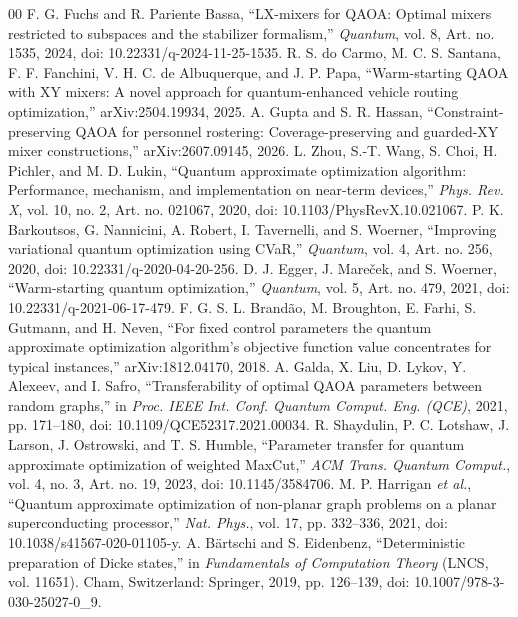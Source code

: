 \documentclass[conference]{IEEEtran}
\begin{document}
\begin{thebibliography}{00}
 F. G. Fuchs and R. Pariente Bassa, ``LX-mixers for QAOA: Optimal mixers restricted to subspaces and the stabilizer formalism,'' \textit{Quantum}, vol. 8, Art. no. 1535, 2024, doi: 10.22331/q-2024-11-25-1535.
 R. S. do Carmo, M. C. S. Santana, F. F. Fanchini, V. H. C. de Albuquerque, and J. P. Papa, ``Warm-starting QAOA with XY mixers: A novel approach for quantum-enhanced vehicle routing optimization,'' arXiv:2504.19934, 2025.
 A. Gupta and S. R. Hassan, ``Constraint-preserving QAOA for personnel rostering: Coverage-preserving and guarded-XY mixer constructions,'' arXiv:2607.09145, 2026.
 L. Zhou, S.-T. Wang, S. Choi, H. Pichler, and M. D. Lukin, ``Quantum approximate optimization algorithm: Performance, mechanism, and implementation on near-term devices,'' \textit{Phys. Rev. X}, vol. 10, no. 2, Art. no. 021067, 2020, doi: 10.1103/PhysRevX.10.021067.
 P. K. Barkoutsos, G. Nannicini, A. Robert, I. Tavernelli, and S. Woerner, ``Improving variational quantum optimization using CVaR,'' \textit{Quantum}, vol. 4, Art. no. 256, 2020, doi: 10.22331/q-2020-04-20-256.
 D. J. Egger, J. Mare\v{c}ek, and S. Woerner, ``Warm-starting quantum optimization,'' \textit{Quantum}, vol. 5, Art. no. 479, 2021, doi: 10.22331/q-2021-06-17-479.
 F. G. S. L. Brand\~{a}o, M. Broughton, E. Farhi, S. Gutmann, and H. Neven, ``For fixed control parameters the quantum approximate optimization algorithm's objective function value concentrates for typical instances,'' arXiv:1812.04170, 2018.
 A. Galda, X. Liu, D. Lykov, Y. Alexeev, and I. Safro, ``Transferability of optimal QAOA parameters between random graphs,'' in \textit{Proc. IEEE Int. Conf. Quantum Comput. Eng. (QCE)}, 2021, pp. 171--180, doi: 10.1109/QCE52317.2021.00034.
 R. Shaydulin, P. C. Lotshaw, J. Larson, J. Ostrowski, and T. S. Humble, ``Parameter transfer for quantum approximate optimization of weighted MaxCut,'' \textit{ACM Trans. Quantum Comput.}, vol. 4, no. 3, Art. no. 19, 2023, doi: 10.1145/3584706.
 M. P. Harrigan \textit{et al.}, ``Quantum approximate optimization of non-planar graph problems on a planar superconducting processor,'' \textit{Nat. Phys.}, vol. 17, pp. 332--336, 2021, doi: 10.1038/s41567-020-01105-y.
 A. B\"{a}rtschi and S. Eidenbenz, ``Deterministic preparation of Dicke states,'' in \textit{Fundamentals of Computation Theory} (LNCS, vol. 11651). Cham, Switzerland: Springer, 2019, pp. 126--139, doi: 10.1007/978-3-030-25027-0\_9.

\end{thebibliography}
\end{document}
